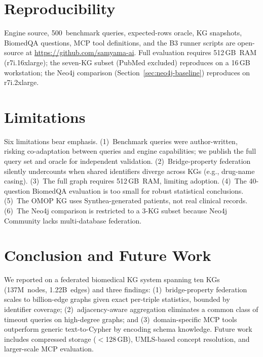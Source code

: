 \documentclass[runningheads]{llncs}
\begin{document}
\section{Reproducibility}\label{sec:reproducibility}

Engine source, 500~benchmark queries, expected-rows oracle, KG
snapshots, BiomedQA questions, MCP tool definitions, and the B3
runner scripts are open-source at
\url{https://github.com/samyama-ai}.  Full evaluation requires
512\,GB~RAM (r7i.16xlarge); the seven-KG subset (PubMed excluded)
reproduces on a 16\,GB workstation; the Neo4j comparison
(Section~\ref{sec:neo4j-baseline}) reproduces on r7i.2xlarge.

\section{Limitations}\label{sec:limitations}

Six limitations bear emphasis.
(1)~Benchmark queries were author-written, risking co-adaptation
between queries and engine capabilities; we publish the full
query set and oracle for independent validation.
(2)~Bridge-property federation silently undercounts when shared
identifiers diverge across KGs (e.g., drug-name casing).
(3)~The full graph requires 512\,GB~RAM, limiting adoption.
(4)~The 40-question BiomedQA evaluation is too small for robust
statistical conclusions.
(5)~The OMOP KG uses Synthea-generated patients, not real
clinical records.
(6)~The Neo4j comparison is restricted to a 3-KG subset because
Neo4j Community lacks multi-database federation.

\section{Conclusion and Future Work}\label{sec:conclusion}

We reported on a federated biomedical KG system spanning ten KGs
(137M~nodes, 1.22B~edges) and three findings: (1)~bridge-property
federation scales to billion-edge graphs given exact per-triple
statistics, bounded by identifier coverage; (2)~adjacency-aware
aggregation eliminates a common class of timeout queries on
high-degree graphs; and (3)~domain-specific MCP tools outperform
generic text-to-Cypher by encoding schema knowledge.  Future work
includes compressed storage ($<$128\,GB), UMLS-based concept
resolution, and larger-scale MCP evaluation.
\end{document}
